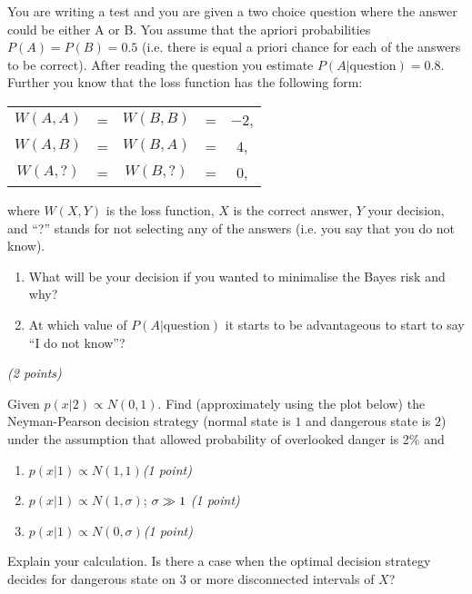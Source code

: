 \documentclass[a4paper,12pt]{article}
\begin{document}
  You are writing a test and you are given a two choice question where
  the answer could be either A or B. You assume that the apriori probabilities $P(A) =
  P(B) = 0.5$ (i.e. there is equal a priori chance for each of the answers
  to be correct). After reading the question you estimate
  $P(A|\mbox{question}) = 0.8$. Further you know that the loss function
  has the following form:\newline

 \begin{tabular}{ccccc}
    $W(A, A)$ & = & $W(B, B)$ & = & $-2$,\\
    $W(A, B)$ & = & $W(B, A)$ & = & $4$,\\
    $W(A, ?)$ & = & $W(B, ?)$ & = & $0$,
  \end{tabular}\newline

  where $W(X, Y)$ is the loss function, $X$ is the correct answer, 
  $Y$ your decision, and ``?'' stands for not selecting any of the
  answers (i.e. you say that you do not know).

  \begin{enumerate}
    \item What will be your decision if you wanted to minimalise the
      Bayes risk and why?
    \item At which value of $P(A|\mbox{question})$ it starts to be
      advantageous to start to say ``I do not know''?
  \end{enumerate}

  \hfill {\it (2 points)}

  \vspace*{1em}

   \newline

  Given $p(x|2) \propto N(0,1)$. Find (approximately using the plot below) the Neyman-Pearson decision strategy (normal state is $1$ and dangerous state is $2$) under the assumption that allowed probability of overlooked danger is 2\% and
  \begin{enumerate}
    \item $p(x|1) \propto N(1,1)$\hfill {\it (1 point)}
    \item $p(x|1) \propto N(1,\sigma)$; $\sigma \gg 1\hfill$ {\it (1 point)}
    \item $p(x|1) \propto N(0,\sigma)$\hfill {\it (1 point)}
  \end{enumerate}
  Explain your calculation. Is there a case when the optimal decision strategy decides for dangerous state on 3 or more disconnected intervals of $X$?
\end{document}
